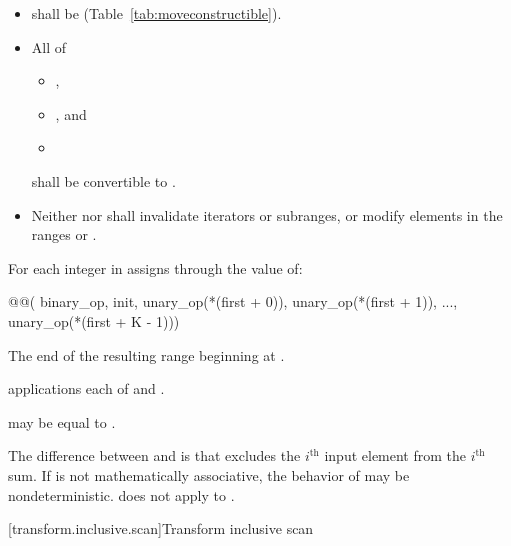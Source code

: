 \begin{itemdescr}
\pnum
\requires
\begin{itemize}
\item {} shall be  (Table~\ref{tab:moveconstructible}).
\item All of
\begin{itemize}
\item {},
\item {}, and
\item {}
\end{itemize}
shall be convertible to .
\item Neither  nor  shall invalidate iterators or
subranges, or modify elements in the ranges
 or
.
\end{itemize}

\pnum
\effects
For each integer  in 
assigns through  the value of:
\begin{codeblock}
@@(
    binary_op, init,
    unary_op(*(first + 0)), unary_op(*(first + 1)), ..., unary_op(*(first + K - 1)))
\end{codeblock}

\pnum
\returns
The end of the resulting range beginning at .

\pnum
\complexity
{} applications each of  and
.

\pnum
\remarks
{} may be equal to .

\pnum
\begin{note}
The difference between  and
 is that 
excludes the $i^\text{th}$ input element from the $i^\text{th}$ sum. If  is not
mathematically associative, the behavior of 
may be nondeterministic.  does not apply
 to .
\end{note}
\end{itemdescr}

[transform.inclusive.scan]{Transform inclusive scan}

